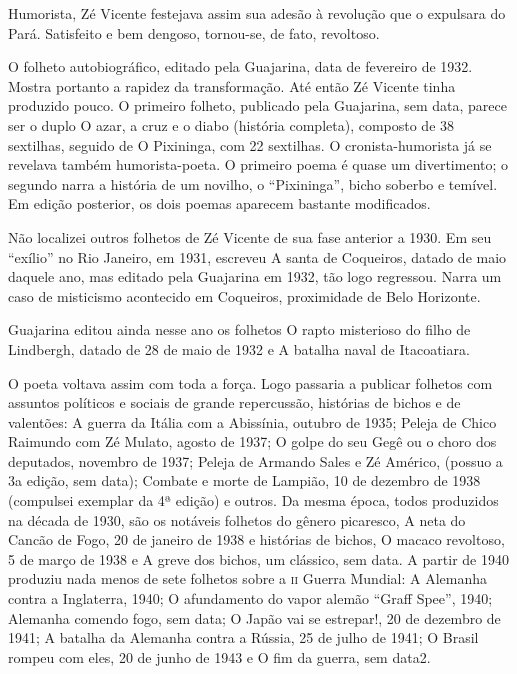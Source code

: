 Humorista, Zé Vicente festejava assim sua adesão à revolução que o
expulsara do Pará. Satisfeito e bem dengoso, tornou-se, de fato,
revoltoso.

O folheto autobiográfico, editado pela Guajarina, data de fevereiro de
1932. Mostra portanto a rapidez da transformação. Até então Zé
Vicente tinha produzido pouco. O primeiro folheto, publicado pela
Guajarina, sem data, parece ser o duplo O azar, a cruz e o diabo
(história completa), composto de 38 sextilhas, seguido de O
Pixininga, com 22 sextilhas. O cronista-humorista já se revelava
também humorista-poeta. O primeiro poema é quase um divertimento; o
segundo narra a história de um novilho, o “Pixininga”, bicho soberbo
e temível. Em edição posterior, os dois poemas aparecem bastante
modificados.

Não localizei outros folhetos de Zé Vicente de sua fase anterior a
1930. Em seu “exílio” no Rio Janeiro, em 1931, escreveu A santa de
Coqueiros, datado de maio daquele ano, mas editado pela Guajarina em
1932, tão logo regressou. Narra um caso de misticismo acontecido em
Coqueiros, proximidade de Belo Horizonte. 

Guajarina editou ainda nesse ano os folhetos O rapto misterioso do
filho de Lindbergh, datado de 28 de maio de 1932 e A batalha naval de
Itacoatiara.

O poeta voltava assim com toda a força. Logo passaria a publicar
folhetos com assuntos políticos e sociais de grande repercussão,
histórias de bichos e de valentões: A guerra da Itália com a
Abissínia, outubro de 1935; Peleja de Chico Raimundo com Zé Mulato,
agosto de 1937; O golpe do seu Gegê ou o choro dos deputados,
novembro de 1937; Peleja de Armando Sales e Zé Américo, (possuo a 3a
edição, sem data); Combate e morte de Lampião, 10 de dezembro de 1938
(compulsei exemplar da 4ª edição) e outros. Da mesma época, todos
produzidos na década de 1930, são os notáveis folhetos do gênero
picaresco, A neta do Cancão de Fogo, 20 de janeiro de 1938 e
histórias de bichos, O macaco revoltoso, 5 de março de 1938 e A greve
dos bichos, um clássico, sem data. A partir de 1940 produziu nada
menos de sete folhetos sobre a \textsc{ii} Guerra Mundial: A Alemanha contra a
Inglaterra, 1940; O afundamento do vapor alemão “Graff Spee”, 1940;
Alemanha comendo fogo, sem data; O Japão vai se estrepar!, 20 de
dezembro de 1941; A batalha da Alemanha contra a Rússia, 25 de julho
de 1941; O Brasil rompeu com eles, 20 de junho de 1943 e O fim da
guerra, sem data2.

